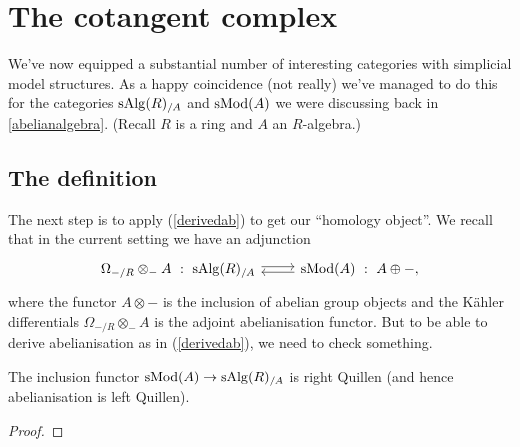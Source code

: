 \section{The cotangent complex}

We've now equipped a substantial number of interesting categories with
simplicial model structures. As a happy coincidence (not really) we've
managed to do this for the categories $\mathrm{s}\mathrm{Alg}(R)_{/A}$ and $\mathrm{s}\mathrm{Mod}(A)$
we were discussing back in \textsection \ref{abelianalgebra}. (Recall
$R$ is a ring and $A$ an $R$-algebra.)

\subsection{The definition}

The next step is to apply (\ref{derivedab}) to get our ``homology
object''. We recall that in the current setting we have an adjunction
\[
\begin{tikzcd}
  \Omega_{-/R} \otimes_- A \ : \ \s\Alg(R)_{/A} \rar[yshift=2pt] &
  \s\Mod(A) \ :\ A \oplus -, \lar[yshift=-2pt]
\end{tikzcd}
\]
where the functor $A \otimes -$ is the inclusion of abelian group
objects and the K\"ahler differentials $\Omega_{-/R} \otimes_- A$ is
the adjoint abelianisation functor. But to be able to derive
abelianisation as in (\ref{derivedab}), we need to check something.

\begin{lemma}
  The inclusion functor $\mathrm{s}\mathrm{Mod}(A) \to \mathrm{s}\mathrm{Alg}(R)_{/A}$ is right
  Quillen (and hence abelianisation is left Quillen).
\end{lemma}

\begin{proof}
  
\end{proof}


\nocite{iyengar-cotangent, goerssjardine}




